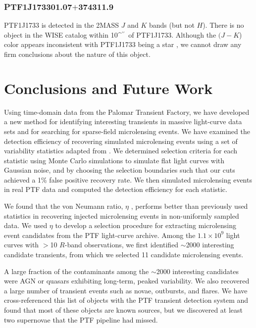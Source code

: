 \documentclass{emulateapj}
\def\asec{\ifmmode^{\prime\prime}\else$^{\prime\prime}$\fi}
\begin{document}
\subsubsection*{PTF1J173301.07$+$374311.9} %
PTF1J1733 is detected in the 2MASS $J$ and $K$ bands (but not $H$). There is no object in the WISE catalog within 10\asec\ of PTF1J1733. Although the $(J-K$) color appears inconsistent with PTF1J1733 being a star \citep{kev07}, we cannot draw any firm conclusions about the nature of this object. 

\section{Conclusions and Future Work}\label{sec:conc}
Using time-domain data from the Palomar Transient Factory, we have developed a new method for identifying interesting transients in massive light-curve data sets and for searching for sparse-field microlensing events. We have examined the detection efficiency of recovering simulated microlensing events using a set of variability statistics adapted from \citet{shin2009}. We determined selection criteria for each statistic using Monte Carlo simulations to simulate flat light curves with Gaussian noise, and by choosing the selection boundaries such that our cuts achieved a 1\% false positive recovery rate. We then simulated microlensing events in real PTF data and computed the detection efficiency for each statistic. 

We found that the von Neumann ratio, $\eta$ \citep[or Durbin-Watson statistic;][]{von_neumann1941, durbin50}, performs better than previously used statistics in recovering injected microlensing events in non-uniformly sampled data. We used $\eta$ to develop a selection procedure for extracting microlensing event candidates from the PTF light-curve archive. Among the $1.1 \times 10^9$ light curves with $>$10 $R$-band observations, we first identified $\sim$2000 interesting candidate transients, from which we selected 11 candidate microlensing events.

A large fraction of the contaminants among the $\sim$2000 interesting candidates were AGN or quasars exhibiting long-term, peaked variability. We also recovered a large number of transient events such as novae, outbursts, and flares. We have cross-referenced this list of objects with the PTF transient detection system and found that most of these objects are known sources, but we discovered at least two supernovae that the PTF pipeline had missed. 
\end{document}
